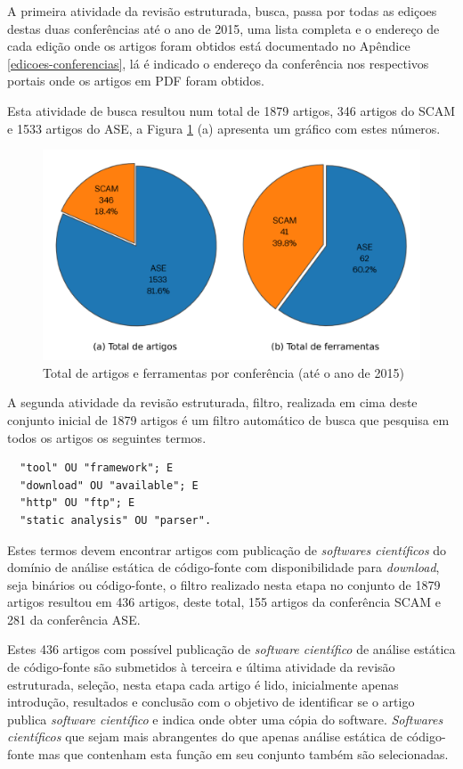 A primeira atividade da revisão estruturada, busca, passa por todas as ediçoes
destas duas conferências até o ano de 2015, uma lista completa e o endereço de
cada edição onde os artigos foram obtidos está documentado no Apêndice
\ref{edicoes-conferencias}, lá é indicado o endereço da conferência nos
respectivos portais onde os artigos em PDF foram obtidos.

Esta atividade de busca resultou num total de 1879 artigos, 346 artigos do SCAM
e 1533 artigos do ASE, a Figura \ref{grafico-total-artigos} (a) apresenta um
gráfico com estes números.

\begin{figure}[H]
  \center
  \includegraphics[scale=0.9]{imagens/total-artigos-e-ferramentas.png}
  \caption{Total de artigos e ferramentas por conferência (até o ano de 2015)}
  \label{grafico-total-artigos}
\end{figure}

A segunda atividade da revisão estruturada, filtro, realizada em cima deste conjunto
inicial de 1879 artigos é um filtro automático de busca que pesquisa em todos
os artigos os seguintes termos.

\begin{verbatim}
  "tool" OU "framework"; E
  "download" OU "available"; E
  "http" OU "ftp"; E
  "static analysis" OU "parser".
\end{verbatim}

Estes termos devem encontrar artigos com publicação de {\it softwares
científicos} do domínio de análise estática de código-fonte com disponibilidade
para {\it download}, seja binários ou código-fonte, o filtro realizado nesta
etapa no conjunto de 1879 artigos resultou em 436 artigos, deste total,
155 artigos da conferência SCAM e 281 da conferência ASE.

Estes 436 artigos com possível publicação de {\it software científico} de
análise estática de código-fonte são submetidos à terceira e última atividade
da revisão estruturada, seleção, nesta etapa cada artigo é lido, inicialmente
apenas introdução, resultados e conclusão com o objetivo de identificar se o
artigo publica {\it software científico} e indica onde obter uma cópia do
software. {\it Softwares científicos} que sejam mais abrangentes do que apenas
análise estática de código-fonte mas que contenham esta função em seu conjunto
também são selecionadas.

